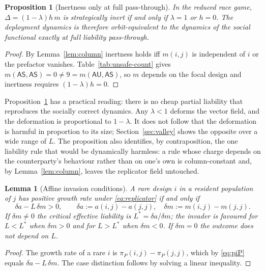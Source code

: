 \documentclass[11pt,a4paper]{article}
\newtheorem{proposition}[theorem]{Proposition}
\newtheorem{lemma}[theorem]{Lemma}
\theoremstyle{definition}
\newcommand{\AS}{\textsf{AS}}
\newcommand{\AU}{\textsf{AU}}
\newcommand{\piP}{\pi_{P}}
\begin{document}
\begin{proposition}[Inertness only at full pass-through]\label{prop:inert}
In the reduced race game, $\Delta=(1-\lambda)h\,m$ is strategically inert if
and only if $\lambda=1$ or $h=0$. The deployment dynamics is therefore
orbit-equivalent to the dynamics of the social functional exactly at full
liability pass-through.
\end{proposition}

\begin{proof}
By Lemma~\ref{lem:column} inertness holds iff $m(i,j)$ is independent of $i$
or the prefactor vanishes. Table~\ref{tab:unsafe-count} gives
$m(\AS,\AS)=0\neq 9=m(\AU,\AS)$, so $m$ depends on the focal design and
inertness requires $(1-\lambda)h=0$.
\end{proof}

Proposition~\ref{prop:inert} has a practical reading: there is no cheap
partial liability that reproduces the socially correct dynamics. Any
$\lambda<1$ deforms the vector field, and the deformation is proportional to
$1-\lambda$. It does not follow that the deformation is harmful in proportion
to its size; Section~\ref{sec:valley} shows the opposite over a wide range of
$L$. The proposition also identifies, by contraposition, the one liability
rule that would be dynamically harmless: a rule whose charge depends on the
counterparty's behaviour rather than on one's own is column-constant and,
by Lemma~\ref{lem:column}, leaves the replicator field untouched.

\begin{lemma}[Affine invasion conditions]\label{lem:affine}
A rare design $i$ in a resident population of $j$ has positive growth rate
under \eqref{eq:replicator} if and only if
\begin{equation}
\delta a - L\,\delta m > 0,
\qquad
\delta a := a(i,j)-a(j,j),
\quad
\delta m := m(i,j)-m(j,j).
\label{eq:invasion}
\end{equation}
If $\delta m\neq 0$ the critical effective liability is
$L^{*}=\delta a/\delta m$; the invader is favoured for $L<L^{*}$ when
$\delta m>0$ and for $L>L^{*}$ when $\delta m<0$. If $\delta m=0$ the outcome
does not depend on $L$.
\end{lemma}

\begin{proof}
The growth rate of a rare $i$ is $\piP(i,j)-\piP(j,j)$, which by
\eqref{eq:piP} equals $\delta a-L\,\delta m$. The case distinction follows by
solving a linear inequality.
\end{proof}
\end{document}
